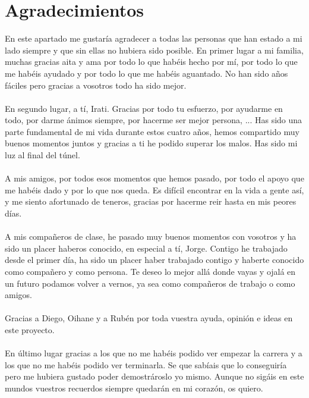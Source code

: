 \chapter*{Agradecimientos}
\thispagestyle{fancy}

En este apartado me gustaría agradecer a todas las personas que han estado a mi lado siempre y que sin ellas no hubiera sido posible. En primer lugar a mi familia, muchas gracias aita y ama por todo lo que habéis hecho por mí, por todo lo que me habéis ayudado y por todo lo que me habéis aguantado. No han sido años fáciles pero gracias a vosotros todo ha sido mejor.
\\\\
En segundo lugar, a tí, Irati. Gracias por todo tu esfuerzo, por ayudarme en todo, por darme ánimos siempre, por hacerme ser mejor persona, ... Has sido una parte fundamental de mi vida durante estos cuatro años, hemos compartido muy buenos momentos juntos y gracias a ti he podido superar los malos. Has sido mi luz al final del túnel.  
\\\\
A mis amigos, por todos esos momentos que hemos pasado, por todo el apoyo que me habéis dado y por lo que nos queda. Es difícil encontrar en la vida a gente así, y me siento afortunado de teneros, gracias por hacerme reir hasta en mis peores días.
\\\\
A mis compañeros de clase, he pasado muy buenos momentos con vosotros y ha sido un placer haberos conocido, en especial a tí, Jorge. Contigo he trabajado desde el primer día, ha sido un placer haber trabajado contigo y haberte conocido como compañero y como persona. Te deseo lo mejor allá donde vayas y ojalá en un futuro podamos volver a vernos, ya sea como compañeros de trabajo o como amigos.
\\\\
Gracias a Diego, Oihane y a Rubén por toda vuestra ayuda, opinión e ideas en este proyecto.
\\\\
En último lugar gracias a los que no me habéis podido ver empezar la carrera y a los que no me habéis podido ver terminarla. Se que sabíais que lo conseguiría pero me hubiera gustado poder demostrároslo yo mismo. Aunque no sigáis en este mundos vuestros recuerdos siempre quedarán en mi corazón, os quiero.